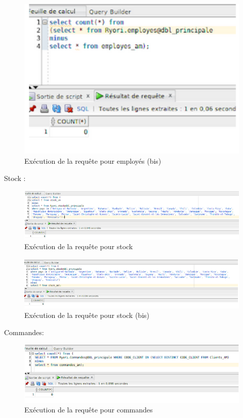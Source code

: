 \documentclass[10pt,a4paper]{article}
\theoremstyle{plain}
\begin{document}
\begin{figure}[H]
	\centering
	\includegraphics[width=15cm]{AM_req2bis.png}
	\caption{Exécution de la requête pour employés (bis)}
\end{figure}

Stock :\\
\begin{figure}[H]
	\centering
	\includegraphics[width=15cm]{AM_req3.png}
	\caption{Exécution de la requête pour stock}
\end{figure}

\begin{figure}[H]
	\centering
	\includegraphics[width=15cm]{AM_req3bis.png}
	\caption{Exécution de la requête pour stock (bis)}
\end{figure}

Commandes:\\
\begin{figure}[H]
	\centering
	\includegraphics[width=15cm]{AM_req4.png}
	\caption{Exécution de la requête pour commandes}
\end{figure}
\end{document}
